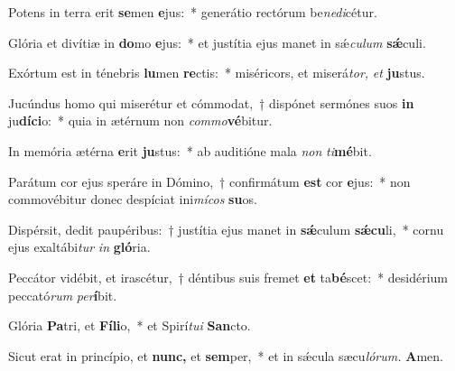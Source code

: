 \item Potens in terra erit \textbf{se}men \textbf{e}jus:~* generátio rectórum be\textit{nedi}\hspace{-0.01em}cétur.
\item Glória et divítiæ in \textbf{do}mo \textbf{e}jus:~* et justítia ejus manet in sǽ\tinyhspace\textit{culum} \textbf{sǽ}culi.
\item Exórtum est in ténebris \textbf{lu}men \textbf{re}ctis:~* miséricors, et miserá\tinyhspace\textit{tor,} \textit{et} \textbf{ju}stus.
\item Jucúndus homo qui miserétur et cómmodat,~† dispónet sermónes suos \textbf{in} ju\textbf{díci}o:~* quia in ætérnum non \textit{commo}\textbf{vé}bitur.
\item In memória ætérna \textbf{e}rit \textbf{ju}stus:~* ab auditióne mala \textit{non} \textit{ti}\hspace{-0.01em}\textbf{mé}bit.
\item Parátum cor ejus speráre in Dómino,~† confirmátum \textbf{est} cor \textbf{e}jus:~* non commovébitur donec despíciat ini\textit{mícos} \textbf{su}os.
\item Dispérsit, dedit paupéribus:~† justítia ejus manet in \textbf{sǽ}culum \textbf{sǽcu}li,~* cornu ejus exaltábi\textit{tur} \textit{in} \textbf{gló}ria.
\item Peccátor vidébit, et irascétur,~† déntibus suis fremet \textbf{et} ta\textbf{bé}scet:~* desidérium peccató\textit{rum} \textit{per}\textbf{í}bit.
\item Glória \textbf{Pa}tri, et \textbf{Fíli}o,~* et Spirí\tinyhspace\textit{tui} \textbf{San}cto.
\item Sicut erat in princípio, et \textbf{nunc,} et \textbf{sem}per,~* et in sǽcula sæcu\tinyhspace\textit{lórum.} \textbf{A}men.

